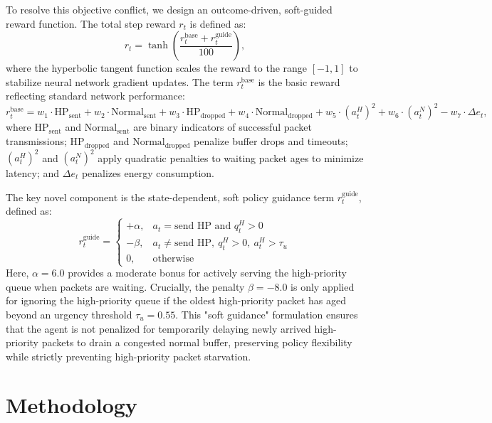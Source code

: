 \documentclass[runningheads,a4paper]{llncs}
\begin{document}
To resolve this objective conflict, we design an outcome-driven, soft-guided reward function. The total step reward $r_t$ is defined as:
\begin{equation}
r_t = \tanh\left(\frac{r_t^{\text{base}} + r_t^{\text{guide}}}{100}\right),
\end{equation}
where the hyperbolic tangent function scales the reward to the range $[-1, 1]$ to stabilize neural network gradient updates. The term $r_t^{\text{base}}$ is the basic reward reflecting standard network performance:
\begin{equation}
r_t^{\text{base}} = w_1 \cdot \text{HP}_{\text{sent}} + w_2 \cdot \text{Normal}_{\text{sent}} + w_3 \cdot \text{HP}_{\text{dropped}} + w_4 \cdot \text{Normal}_{\text{dropped}} + w_5 \cdot (a_t^{H})^2 + w_6 \cdot (a_t^{N})^2 - w_7 \cdot \Delta e_t,
\end{equation}
where $\text{HP}_{\text{sent}}$ and $\text{Normal}_{\text{sent}}$ are binary indicators of successful packet transmissions; $\text{HP}_{\text{dropped}}$ and $\text{Normal}_{\text{dropped}}$ penalize buffer drops and timeouts; $(a_t^{H})^2$ and $(a_t^{N})^2$ apply quadratic penalties to waiting packet ages to minimize latency; and $\Delta e_t$ penalizes energy consumption.

The key novel component is the state-dependent, soft policy guidance term $r_t^{\text{guide}}$, defined as:
\begin{equation}
r_t^{\text{guide}}=
\begin{cases}
+\alpha, & a_t=\text{send HP and } q_t^{H}>0\\
-\beta, & a_t\neq\text{send HP},\ q_t^{H}>0,\ a_t^{H}>\tau_u\\
0, & \text{otherwise}
\end{cases}
\end{equation}
Here, $\alpha = 6.0$ provides a moderate bonus for actively serving the high-priority queue when packets are waiting. Crucially, the penalty $\beta = -8.0$ is only applied for ignoring the high-priority queue if the oldest high-priority packet has aged beyond an urgency threshold $\tau_u = 0.55$. This "soft guidance" formulation ensures that the agent is not penalized for temporarily delaying newly arrived high-priority packets to drain a congested normal buffer, preserving policy flexibility while strictly preventing high-priority packet starvation.

\section{Methodology}
\end{document}
